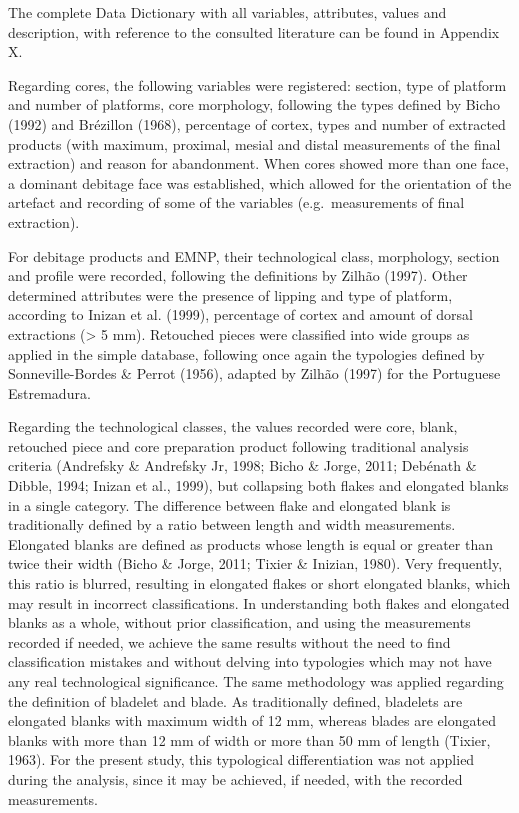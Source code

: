 \documentclass[12pt,twoside]{reedthesis}
\begin{document}
The complete Data Dictionary with all variables, attributes, values and description, with reference to the consulted literature can be found in Appendix X.

Regarding cores, the following variables were registered: section, type of platform and number of platforms, core morphology, following the types defined by Bicho (1992) and Brézillon (1968), percentage of cortex, types and number of extracted products (with maximum, proximal, mesial and distal measurements of the final extraction) and reason for abandonment. When cores showed more than one face, a dominant debitage face was established, which allowed for the orientation of the artefact and recording of some of the variables (e.g.~measurements of final extraction).

For debitage products and EMNP, their technological class, morphology, section and profile were recorded, following the definitions by Zilhão (1997). Other determined attributes were the presence of lipping and type of platform, according to Inizan et al. (1999), percentage of cortex and amount of dorsal extractions (\textgreater{} 5 mm). Retouched pieces were classified into wide groups as applied in the simple database, following once again the typologies defined by Sonneville-Bordes \& Perrot (1956), adapted by Zilhão (1997) for the Portuguese Estremadura.

Regarding the technological classes, the values recorded were core, blank, retouched piece and core preparation product following traditional analysis criteria (Andrefsky \& Andrefsky Jr, 1998; Bicho \& Jorge, 2011; Debénath \& Dibble, 1994; Inizan et al., 1999), but collapsing both flakes and elongated blanks in a single category. The difference between flake and elongated blank is traditionally defined by a ratio between length and width measurements. Elongated blanks are defined as products whose length is equal or greater than twice their width (Bicho \& Jorge, 2011; Tixier \& Inizian, 1980). Very frequently, this ratio is blurred, resulting in elongated flakes or short elongated blanks, which may result in incorrect classifications. In understanding both flakes and elongated blanks as a whole, without prior classification, and using the measurements recorded if needed, we achieve the same results without the need to find classification mistakes and without delving into typologies which may not have any real technological significance. The same methodology was applied regarding the definition of bladelet and blade. As traditionally defined, bladelets are elongated blanks with maximum width of 12 mm, whereas blades are elongated blanks with more than 12 mm of width or more than 50 mm of length (Tixier, 1963). For the present study, this typological differentiation was not applied during the analysis, since it may be achieved, if needed, with the recorded measurements.
\end{document}
